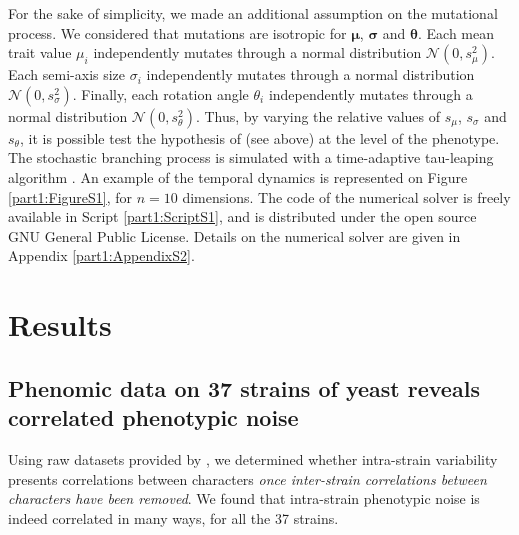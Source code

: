 For the sake of simplicity, we made an additional assumption on the mutational process. We considered that mutations are isotropic for $\boldsymbol{\mu}$, $\boldsymbol{\sigma}$ and  $\boldsymbol{\theta}$. Each mean trait value $\mu_i$ independently mutates through a normal distribution $\mathcal{N}(0,s^2_\mu)$. Each semi-axis size $\sigma_i$ independently mutates through a normal distribution $\mathcal{N}(0,s^2_\sigma)$. Finally, each rotation angle $\theta_i$ independently mutates through a normal distribution $\mathcal{N}(0,s^2_\theta)$. Thus, by varying the relative values of $s_\mu$, $s_\sigma$ and $s_\theta$, it is possible test the hypothesis of \cite{metzger-et-al-2015} (see above) at the level of the phenotype.
The stochastic branching process is simulated with a time-adaptive tau-leaping algorithm \citep{gillespie-2007}.
An example of the temporal dynamics is represented on Figure \ref{part1:FigureS1}, for $n=10$ dimensions.
The code of the numerical solver is freely available in Script \ref{part1:ScriptS1}, and is distributed under the open source GNU General Public License. Details on the numerical solver are given in Appendix \ref{part1:AppendixS2}.


\section{Results}


\subsection{Phenomic data on 37 strains of yeast reveals correlated phenotypic noise}

Using raw datasets provided by \cite{yvert-et-al-2013}, we determined whether intra-strain variability presents correlations between characters \textit{once inter-strain correlations  between characters have been removed}. We found that intra-strain phenotypic noise is indeed correlated in many ways, for all the 37 strains. 

